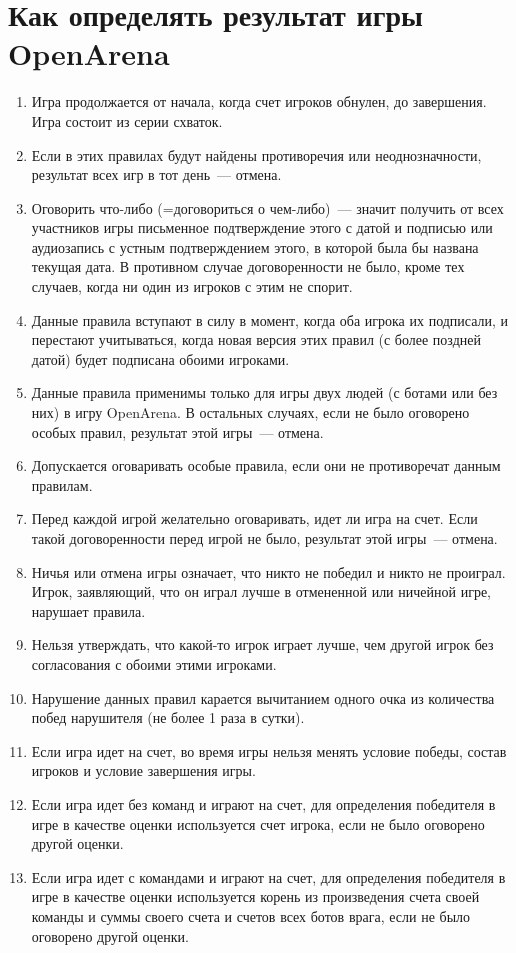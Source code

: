 \documentclass[a4paper,titlepage,12pt]{article}
\begin{document}
{\center\section*{Как определять результат игры OpenArena}}

\thispagestyle{empty}

\begin{enumerate}
\item Игра продолжается от начала, когда счет игроков обнулен,
    до завершения.
    Игра состоит из серии схваток.
\item Если в этих правилах будут найдены противоречия или неоднозначности,
    результат всех игр в тот день~--- отмена.
\item Оговорить что-либо (=договориться о чем-либо)~---
    значит получить от всех участников игры
    письменное подтверждение этого с датой и подписью
    или аудиозапись с устным подтверждением этого,
    в которой была бы названа текущая дата.
    В противном случае договоренности не было,
    кроме тех случаев, когда ни один из игроков с этим не спорит.
\item Данные правила вступают в силу в момент, когда оба игрока
    их подписали, и перестают учитываться, когда новая версия этих правил
    (с более поздней датой) будет подписана обоими игроками.
\item Данные правила применимы только для игры двух людей
    (с ботами или без них) в игру OpenArena.
    В остальных случаях, если не было оговорено особых правил,
    результат этой игры~--- отмена.
\item Допускается оговаривать особые правила, если они не противоречат
    данным правилам.
\item Перед каждой игрой желательно оговаривать, идет ли игра на счет.
    Если такой договоренности перед игрой не было,
    результат этой игры~--- отмена.
\item Ничья или отмена игры означает, что никто не победил и никто не проиграл.
    Игрок, заявляющий, что он играл лучше в отмененной или ничейной игре,
    нарушает правила.
\item Нельзя утверждать, что какой-то игрок играет лучше, чем другой игрок
    без согласования с обоими этими игроками.
\item Нарушение данных правил карается вычитанием одного очка из
    количества побед нарушителя (не более 1 раза в сутки).
\item Если игра идет на счет, во время игры нельзя менять условие победы,
    состав игроков и условие завершения игры.
\item Если игра идет без команд и играют на счет, для определения
    победителя в игре в качестве оценки используется счет игрока,
    если не было оговорено другой оценки.
\item Если игра идет с командами и играют на счет, для определения
    победителя в игре в качестве оценки используется корень из
    произведения счета своей команды и суммы своего счета и счетов
    всех ботов врага, если не было оговорено другой оценки.


\end{enumerate}
\end{document}
